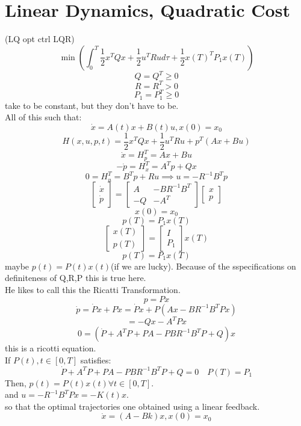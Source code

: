 \documentclass{article}
\begin{document}
\section{Linear Dynamics, Quadratic Cost}
(LQ opt ctrl LQR)\\
\[\min(\int_0^T\frac{1}{2}x^TQx+\frac{1}{2}u^TRu d\tau+\frac{1}{2}x(T)^TP_1x(T))\]
\[Q=Q^T\geq 0\]
\[R=R^T>0\]
\[P_1=P_1^T\geq 0\]
take to be constant, but they don't have to be.\\
All of this such that:\\
\[\dot{x}=A(t)x+B(t)u, x(0)=x_0\]
\[H(x,u,p,t)=\frac{1}{2}x^TQx+\frac{1}{2}u^TRu+p^T(Ax+Bu)\]
\[\dot{x}=H^T_p=Ax+Bu\]
\[-\dot{p}=H_x^T=A^Tp+Qx\]
\[0=H_u^T=B^Tp+Ru\implies u=-R^{-1}B^Tp\]
\[\begin{bmatrix}\dot{x}\\\dot{p}\end{bmatrix}=\begin{bmatrix}A & -BR^{-1}B^T\\-Q&-A^T\end{bmatrix}\begin{bmatrix}x\\p\end{bmatrix}\]
\[x(0)=x_0\]
\[p(T)=P_1x(T)\]
\[\begin{bmatrix}x(T)\\p(T)\end{bmatrix}=\begin{bmatrix}I\\P_1\end{bmatrix}x(T)\]
\[p(T)=P_1x(T)\]
maybe $p(t)=P(t)x(t)$(if we are lucky). Because of the sspecifications on definiteness of Q,R,P this is true here.\\
He likes to call this the Ricatti Transformation.\\
\[p=Px\]
\[\dot{p}=\dot{P}x+P\dot{x}=\dot{P}x+P(Ax-BR^{-1}B^TPx)\]
\[=-Qx-A^TPx\]
\[0=(\dot{P}+A^TP+PA-PBR^{-1}B^TP+Q)x\]
this is a ricotti equation.\\
If $P(t), t\in[0,T]$ satisfies:\\
\[\dot{P}+A^TP+PA-PBR^{-1}B^TP+Q=0\quad P(T)=P_1\]
Then, $p(t)=P(t)x(t) \forall t\in[0,T]$.\\
and $u=-R^{-1}B^TPx=-K(t)x$.\\
so that the optimal trajectories one obtained using a linear feedback.\\
\[\dot{x}=(A-Bk)x, x(0)=x_0\]
\\
\end{document}
